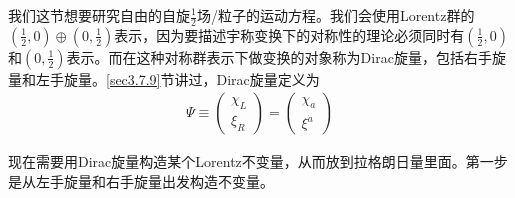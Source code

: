 我们这节想要研究自由的自旋$\frac{1}{2}$场/粒子的运动方程。我们会使用Lorentz群的$(\frac{1}{2},0)\oplus(0,\frac{1}{2})$表示，因为要描述宇称变换下的对称性的理论必须同时有$(\frac{1}{2},0)$和$(0,\frac{1}{2})$表示。而在这种对称群表示下做变换的对象称为Dirac旋量，包括右手旋量和左手旋量。\ref{sec3.7.9}节讲过，Dirac旋量定义为
\begin{align}
\label{equ6.6}
\Psi\equiv\left(\begin{matrix}\chi_L\\ \xi_R\end{matrix}\right)=\left(\begin{matrix}\chi_a\\ \xi^{\dot{a}}\end{matrix}\right)
\end{align}

现在需要用Dirac旋量构造某个Lorentz不变量，从而放到拉格朗日量里面。第一步是从左手旋量和右手旋量出发构造不变量。

